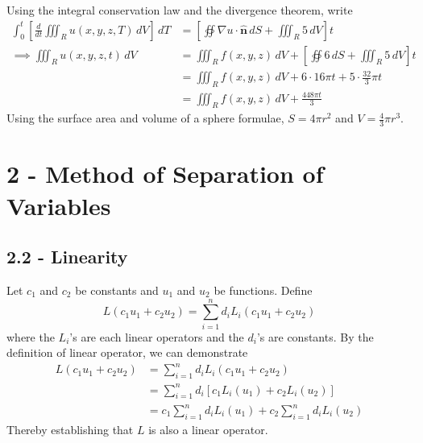 \documentclass[a4paper]{article}
\begin{document}
Using the integral conservation law and the divergence theorem, write
\begin{align*}
	\int^{t}_{0} \!\left[ \frac{d }{d t}\iiint_{R} u \!\left( x,y,z,T \right) \, dV \right] \, dT & = \!\left[ \oiint \nabla u \cdot \pmb{\hat{n}} \, dS + \iiint_{R} 5 \, dV \right]t \\
	\implies \iiint_{R} u \!\left( x,y,z,t \right) \, dV & = \iiint_{R} f \!\left( x,y,z \right) \, dV + \!\left[ \oiint 6 \, dS + \iiint_{R} 5 \, dV \right]t \\
								    & = \iiint_{R} f \!\left( x,y,z \right) \, dV + 6 \cdot 16 \pi t + 5 \cdot \frac{32}{3}\pi t \\
								    & = \iiint_{R} f \!\left( x,y,z \right) \, dV + \frac{448 \pi t}{3}
\end{align*}
Using the surface area and volume of a sphere formulae, \( S = 4 \pi r^{2} \) and \( V = \frac{4}{3}\pi r^{3} \).


\newpage
\section{\textsf{2 - Method of Separation of Variables}}
\subsection{\textsf{2.2 - Linearity}}

Let \( c_{1} \) and \( c_{2} \) be constants and \( u_{1} \) and \( u_{2} \) be functions. Define
\[
	L \!\left( c_{1}u_{1} + c_{2}u_{2} \right) = \sum^{n}_{i=1} d_{i}L_{i}\!\left( c_{1}u_{1} + c_{2}u_{2} \right) 
\]
where the \( L_{i} \)'s are each linear operators and the \( d_{i} \)'s are constants. By the definition of linear operator, we can demonstrate
\begin{align*}
	L \!\left( c_{1}u_{1} + c_{2}u_{2} \right) & = \sum^{n}_{i=1} d_{i}L_{i}\!\left( c_{1}u_{1} + c_{2}u_{2} \right) \\
	 & = \sum^{n}_{i=1} d_{i}\!\left[ c_{1}L_{i}\!\left( u_{1} \right) + c_{2}L_{i}\!\left( u_{2} \right) \right] \\ 
	 & = c_{1}\sum^{n}_{i=1} d_{i}L_{i}\!\left( u_{1} \right) + c_{2}\sum^{n}_{i=1} d_{i}L_{i}\!\left( u_{2} \right)
\end{align*}
Thereby establishing that \( L \) is also a linear operator.

\vspace{12pt}
\end{document}
